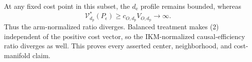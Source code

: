 At any fixed cost point in this subset, the \(d_{\mathrm e}\) profile remains bounded, whereas
\[
\mathcal V_{d_{\mathrm p}}^*(P_\epsilon)
\ge c_{O,d_{\mathrm p}}V_{O,d_{\mathrm p}}\longrightarrow\infty.
\]
Thus the arm-normalized ratio diverges.  Balanced treatment makes (2) independent of the positive cost vector, so the IKM-normalized causal-efficiency ratio diverges as well.  This proves every asserted center, neighborhood, and cost-manifold claim.